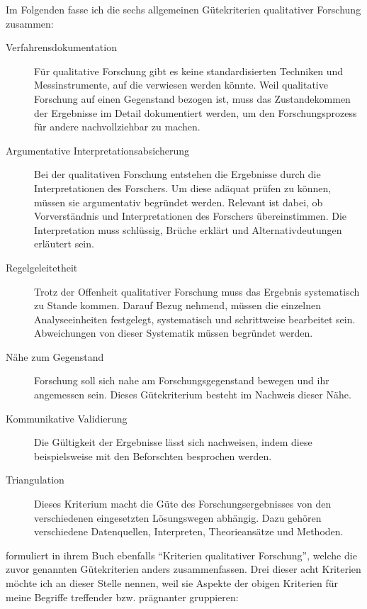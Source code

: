 Im Folgenden fasse ich die sechs allgemeinen Gütekriterien qualitativer Forschung \citep{mayring2002einfhrung} zusammen:
\begin{description}
  \item[Verfahrensdokumentation] Für qualitative Forschung gibt es keine standardisierten Techniken und Messinstrumente, auf die verwiesen werden könnte. Weil qualitative Forschung auf einen Gegenstand bezogen ist, muss das Zustandekommen der Ergebnisse im Detail dokumentiert werden, um den Forschungsprozess für andere nachvollziehbar zu machen.
  
  \item[Argumentative Interpretationsabsicherung] Bei der qualitativen Forschung entstehen die Ergebnisse durch die Interpretationen des Forschers. Um diese adäquat prüfen zu können, müssen sie argumentativ begründet werden. Relevant ist dabei, ob Vorverständnis und Interpretationen des Forschers übereinstimmen. Die Interpretation muss schlüssig, Brüche erklärt und Alternativdeutungen erläutert sein.
  
  \item[Regelgeleitetheit] Trotz der Offenheit qualitativer Forschung muss das Ergebnis systematisch zu Stande kommen. Darauf Bezug nehmend, müssen die einzelnen Analyseeinheiten festgelegt, systematisch und schrittweise bearbeitet sein. Abweichungen von dieser Systematik müssen begründet werden.
  
  \item[Nähe zum Gegenstand] Forschung soll sich nahe am Forschungsgegenstand bewegen und ihr angemessen sein. Dieses Gütekriterium besteht im Nachweis dieser Nähe.
  
  \item[Kommunikative Validierung] Die Gültigkeit der Ergebnisse lässt sich nachweisen, indem diese beispielsweise mit den Beforschten besprochen werden.
  
  \item[Triangulation] Dieses Kriterium macht die Güte des Forschungsergebnisses von den verschiedenen eingesetzten Lösungswegen abhängig. Dazu gehören verschiedene Datenquellen, Interpreten, Theorieansätze und Methoden.
\end{description}

\bigskip

\cite{gesis-solis-00272267} formuliert in ihrem Buch ebenfalls ``Kriterien qualitativer Forschung'', welche die zuvor genannten Gütekriterien anders zusammenfassen. Drei dieser acht Kriterien möchte ich an dieser Stelle nennen, weil sie Aspekte der obigen Kriterien für meine Begriffe treffender bzw. prägnanter gruppieren:

